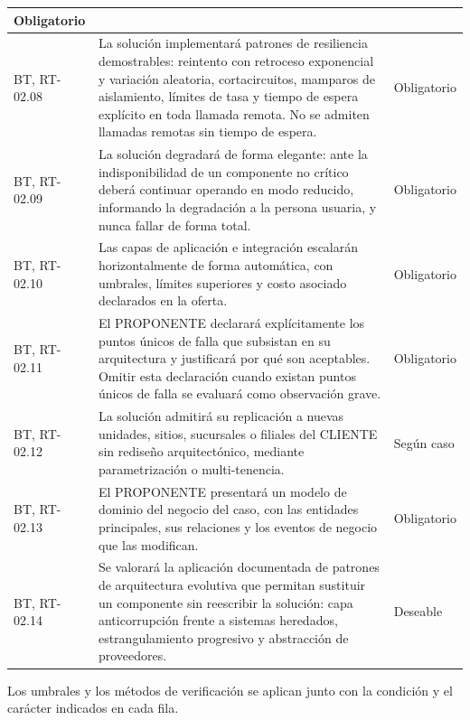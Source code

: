 \begin{longtable}{|L{0.098425\AnchoTablaAnexo}|L{0.814961\AnchoTablaAnexo}|L{0.086614\AnchoTablaAnexo}|}
Obligatorio \\ \hline
BT, RT-02.08 &
La solución implementará patrones de resiliencia demostrables: reintento con retroceso exponencial y variación aleatoria, cortacircuitos, mamparos de aislamiento, límites de tasa y tiempo de espera explícito en toda llamada remota. No se admiten llamadas remotas sin tiempo de espera. &
Obligatorio \\ \hline
{}
BT, RT-02.09 &
La solución degradará de forma elegante: ante la indisponibilidad de un componente no crítico deberá continuar operando en modo reducido, informando la degradación a la persona usuaria, y nunca fallar de forma total. &
Obligatorio \\ \hline
BT, RT-02.10 &
Las capas de aplicación e integración escalarán horizontalmente de forma automática, con umbrales, límites superiores y costo asociado declarados en la oferta. &
Obligatorio \\ \hline
{}
BT, RT-02.11 &
El PROPONENTE declarará explícitamente los puntos únicos de falla que subsistan en su arquitectura y justificará por qué son aceptables. Omitir esta declaración cuando existan puntos únicos de falla se evaluará como observación grave. &
Obligatorio \\ \hline
BT, RT-02.12 &
La solución admitirá su replicación a nuevas unidades, sitios, sucursales o filiales del CLIENTE sin rediseño arquitectónico, mediante parametrización o multi-tenencia. &
Según caso \\ \hline
{}
BT, RT-02.13 &
El PROPONENTE presentará un modelo de dominio del negocio del caso, con las entidades principales, sus relaciones y los eventos de negocio que las modifican. &
Obligatorio \\ \hline
BT, RT-02.14 &
Se valorará la aplicación documentada de patrones de arquitectura evolutiva que permitan sustituir un componente sin reescribir la solución: capa anticorrupción frente a sistemas heredados, estrangulamiento progresivo y abstracción de proveedores. &
Deseable \\ \hline
\end{longtable}

Los umbrales y los métodos de verificación se aplican junto con la condición y el carácter indicados en cada fila.
